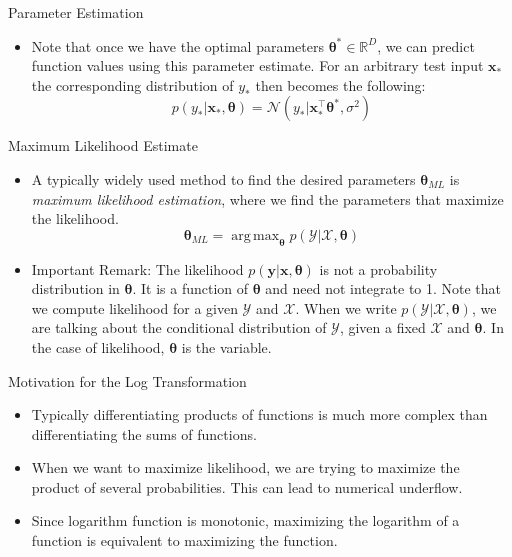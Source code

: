 \documentclass{beamer}
\DeclareMathOperator*{\argmax}{arg\,max}
\begin{document}
\begin{frame}{Parameter Estimation}
\begin{itemize}[<+->]
\item Note that once we have the optimal parameters $\boldsymbol{\theta}^{*} \in \mathbb{R}^{D}$, we can predict function values using this parameter estimate. For an arbitrary test input $\boldsymbol{x}_{*}$ the corresponding distribution of $y_{*}$ then becomes the following:
\begin{equation*}
    p(y_{*}|\boldsymbol{x}_{*}, \boldsymbol{\theta}) = \mathcal{N}(y_{*} | \boldsymbol{x}_{*}^{\top}\boldsymbol{\theta}^{*}, \sigma^{2})
\end{equation*}
\end{itemize}
\end{frame}

\begin{frame}{Maximum Likelihood Estimate}
\begin{itemize}[<+->]
\item A typically widely used method to find the desired parameters $\boldsymbol{\theta}_{ML}$ is \textit{maximum likelihood estimation}, where we find the parameters that maximize the likelihood. 
\begin{equation*}
    \boldsymbol{\theta}_{ML} = \argmax_{\boldsymbol{\theta}} p(\mathcal{Y} | \mathcal{X, \boldsymbol{\theta}})
\end{equation*}
\item Important Remark: The likelihood $p(\boldsymbol{y}|\boldsymbol{x}, \boldsymbol{\theta})$ is not a probability distribution in $\boldsymbol{\theta}$. It is a function of $\boldsymbol{\theta}$ and need not integrate to 1. Note that we compute likelihood for a given $\mathcal{Y}$ and $\mathcal{X}$. When we write $p(\mathcal{Y} | \mathcal{X, \boldsymbol{\theta}})$, we are talking about the conditional distribution of $\mathcal{Y}$, given a fixed $\mathcal{X}$ and $\boldsymbol{\theta}$. In the case of likelihood, $\boldsymbol{\theta}$ is the variable.
\end{itemize}
\end{frame}

\begin{frame}{Motivation for the Log Transformation}
\begin{itemize}[<+->]
\item Typically differentiating products of functions is much more complex than differentiating the sums of functions.
\item When we want to maximize likelihood, we are trying to maximize the product of several probabilities. This can lead to numerical underflow. 
\item Since logarithm function is monotonic, maximizing the logarithm of a function is equivalent to maximizing the function. 
\end{itemize}
\end{frame}
\end{document}
